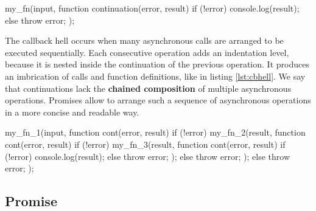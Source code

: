 \begin{code}[js, %
             caption={Example of a continuation}, %
             label={lst:continuation}] %
my_fn(input, function continuation(error, result) {
  if (!error) {
    console.log(result);
  } else {
    throw error;
  }
});
\end{code}

The callback hell occurs when many asynchronous calls are arranged to be executed sequentially.
Each consecutive operation adds an indentation level, because it is nested inside the continuation of the previous operation.
It produces an imbrication of calls and function definitions, like in listing \ref{lst:cbhell}.
We say that continuations lack the \textbf{chained composition} of multiple asynchronous operations.
Promises allow to arrange such a sequence of asynchronous operations in a more concise and readable way.


\begin{code}[js, %
             caption={Example of a sequence of continuations}, %
             label={lst:cbhell}] %
my_fn_1(input, function cont(error, result) {
  if (!error) {
    my_fn_2(result, function cont(error, result) {
      if (!error) {
        my_fn_3(result, function cont(error, result) {
          if (!error) {
            console.log(result);
          } else {
            throw error;
          }
        });
      } else {
        throw error;
      }
    });
  } else {
    throw error;
  }
});
\end{code}

\subsection{Promise} \label{section:definitions:promise}


